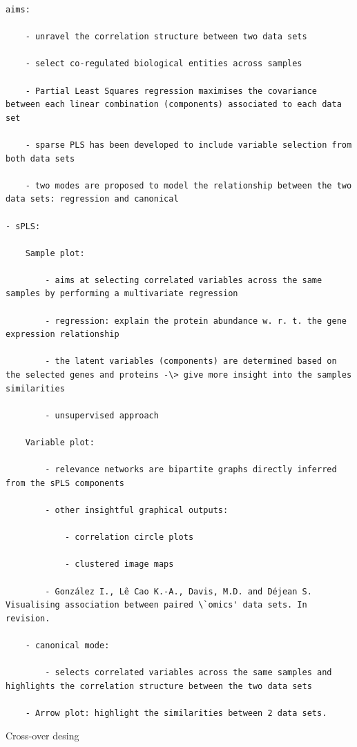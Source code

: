 \documentclass[
]{book}
\begin{document}
\begin{verbatim}
aims:

    - unravel the correlation structure between two data sets

    - select co-regulated biological entities across samples

    - Partial Least Squares regression maximises the covariance between each linear combination (components) associated to each data set

    - sparse PLS has been developed to include variable selection from both data sets

    - two modes are proposed to model the relationship between the two data sets: regression and canonical

- sPLS:

    Sample plot:

        - aims at selecting correlated variables across the same samples by performing a multivariate regression

        - regression: explain the protein abundance w. r. t. the gene expression relationship

        - the latent variables (components) are determined based on the selected genes and proteins -\> give more insight into the samples similarities

        - unsupervised approach

    Variable plot:

        - relevance networks are bipartite graphs directly inferred from the sPLS components

        - other insightful graphical outputs:

            - correlation circle plots

            - clustered image maps

        - González I., Lê Cao K.-A., Davis, M.D. and Déjean S. Visualising association between paired \`omics' data sets. In revision.

    - canonical mode:

        - selects correlated variables across the same samples and highlights the correlation structure between the two data sets

    - Arrow plot: highlight the similarities between 2 data sets.
\end{verbatim}

Cross-over desing
\end{document}
